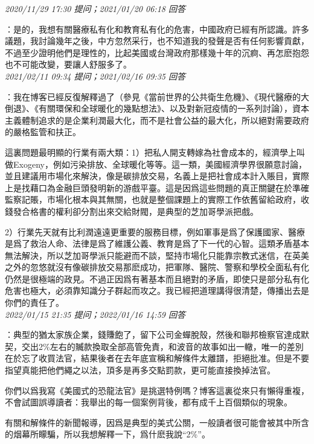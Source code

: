 \documentclass[twocolumn]{ctexart}
\begin{document}
\textit{\hfill\noindent\small 2020/11/29 17:30 提问；2021/01/20 06:18 回答}

：是的，我想有關醫療私有化和教育私有化的危害，中國政府已經有所認識。許多議題，我討論幾年之後，中方忽然采行，也不知道我的發聲是否有任何影響貢獻，不過至少證明他們是理性的，比起美國或台灣政府那樣幾十年的沉痾、再怎麽抱怨也不可能改變，要讓人舒服多了。
\\

\textit{\hfill\noindent\small 2021/02/11 09:34 提问；2021/02/16 09:35 回答}

：我在博客已經反復解釋過了（參見《當前世界的公共衛生危機》、《現代醫療的大倒退》、《有關環保和全球暖化的幾點想法》、以及對新冠疫情的一系列討論），資本主義體制追求的是企業利潤最大化，而不是社會公益的最大化，所以絕對需要政府的嚴格監管和扶正。

這裏問題最明顯的行業有兩大類：1）把私人開支轉嫁為社會成本的，經濟學上叫做Exogeny，例如污染排放、全球暖化等等。這一類，美國經濟學界很願意討論，並且建議用市場化來解決，像是碳排放交易，名義上是把社會成本計入賬目，實際上是找藉口為金融巨頭發明新的游戲平臺。這是因爲這些問題的真正關鍵在於準確監察記賬，市場化根本與其無關，也就是整個課題上的實際工作依舊留給政府，收錢發合格書的權利卻分割出來交給財閥，是典型的芝加哥學派把戲。

2）行業先天就有比利潤遠遠更重要的服務目標，例如軍事是爲了保護國家、醫療是爲了救治人命、法律是爲了維護公義、教育是爲了下一代的心智。這類矛盾基本無法解決，所以芝加哥學派只能避而不談，堅持市場化只能靠宗教式迷信，在英美之外的忽悠就沒有像碳排放交易那麽成功，把軍隊、醫院、警察和學校全面私有化仍然是很極端的政見。不過正因爲有著基本而且絕對的矛盾，即使只是部分私有化危害也極大，必須靠知識分子群起而攻之。我已經把道理講得很清楚，傳播出去是你們的責任了。
\\

\textit{\hfill\noindent\small 2022/01/15 21:35 提问；2022/01/16 14:59 回答}

：典型的猶太家族企業，錢賺飽了，留下公司金蟬脫殼，然後和聯邦檢察官達成默契，交出2\%左右的贓款換取全部高管免責，和波音的故事如出一轍，唯一的差別在於忘了收買法官，結果後者在去年底宣稱和解條件太離譜，拒絕批准。但是不要指望真能把他們繩之以法，頂多是再多交點罰款，更可能直接換掉法官。

你們以爲我寫《美國式的恐龍法官》是挑選特例嗎？博客這裏從來只有懶得重複，不會試圖誤導讀者：我舉出的每一個案例背後，都有成千上百個類似的現象。


有關和解條件的新聞報導，因爲是典型的美式公關，一般讀者很可能會被其中所含的烟幕所矇騙，所以我想解釋一下，爲什麽我說“2\%”。
\end{document}
